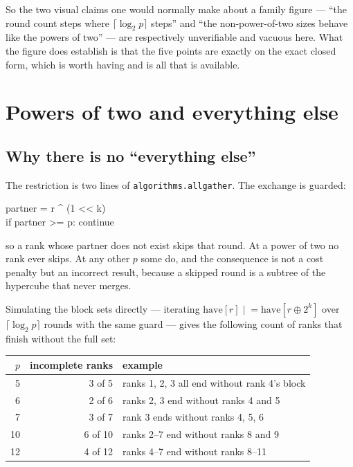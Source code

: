 \documentclass[11pt]{article}
\begin{document}
So the two visual claims one would normally make about a family figure --- ``the round count steps
where $\lceil\log_2 p\rceil$ steps'' and ``the non-power-of-two sizes behave like the powers of
two'' --- are respectively unverifiable and vacuous here. What the figure does establish is that
the five points are exactly on the exact closed form, which is worth having and is all that is
available.

\section{Powers of two and everything else}

\subsection{Why there is no ``everything else''}

The restriction is two lines of \texttt{algorithms.allgather}. The exchange is guarded:

\begin{center}\ttfamily\small
partner = r \^{} (1 << k) \\
if partner >= p: continue
\end{center}

\noindent
so a rank whose partner does not exist skips that round. At a power of two no rank ever skips. At
any other $p$ some do, and the consequence is not a cost penalty but an incorrect result, because
a skipped round is a subtree of the hypercube that never merges.

Simulating the block sets directly --- iterating $\text{have}[r] \mathrel{|}= \text{have}[r \oplus
2^k]$ over $\lceil\log_2 p\rceil$ rounds with the same guard --- gives the following count of
ranks that finish without the full set:

\begin{center}\footnotesize
\begin{tabular}{@{}rrl@{}}
\toprule
  $p$ & incomplete ranks & example \\
\midrule
  5  & 3 of 5   & ranks 1, 2, 3 all end without rank 4's block \\
  6  & 2 of 6   & ranks 2, 3 end without ranks 4 and 5 \\
  7  & 3 of 7   & rank 3 ends without ranks 4, 5, 6 \\
  10 & 6 of 10  & ranks 2--7 end without ranks 8 and 9 \\
  12 & 4 of 12  & ranks 4--7 end without ranks 8--11 \\
\bottomrule
\end{tabular}\normalsize
\end{center}
\end{document}
